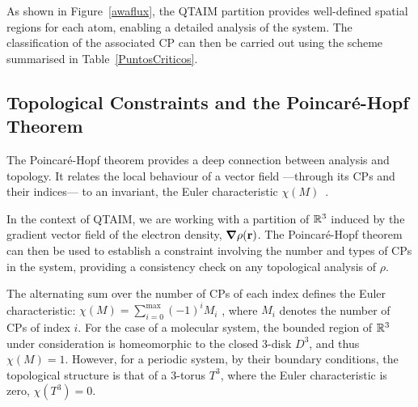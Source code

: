 \vspace{1\baselineskip}%
As shown in Figure~\ref{awaflux}, the \gls{QTAIM} partition provides well-defined
spatial regions for each atom, enabling a detailed analysis of the system. The
classification of the associated \gls{CP} can then be carried out using
the scheme summarised in Table~\ref{PuntosCriticos}.

\newpage
\subsection{Topological Constraints and the Poincaré-Hopf Theorem}\label{phsection}

The Poincaré-Hopf theorem provides a deep connection between analysis and
topology. It relates the local behaviour of a vector field ---through its
\glspl{CP} and their indices--- to an invariant,
the Euler characteristic $\chi(M)$~\cite{Milnor1965}.


In the context of \gls{QTAIM}, we are working with a partition of $\rreal[3]$
induced by the gradient vector field of the electron density,
$\boldsymbol{\nabla}\rho(\mathbf{r})$. The Poincaré-Hopf theorem can then be
used to establish a constraint involving the number and types of \glspl{CP} in
the system, providing a consistency check on any topological analysis of
\(\rho\).

The alternating sum over the number of \glspl{CP} of each index 
defines the Euler characteristic: $\chi(M) = \sum_{i=0}^{\max} (-1)^i M_i$ ,
where $M_i$ denotes the number of \glspl{CP} of index $i$.
For the case of a molecular system, the bounded region of 
$\rreal[3]$ under consideration is homeomorphic to the closed 
3-disk $D^3$, and thus $\chi(M) = 1$.
However, for a periodic system, by their boundary conditions,
the topological structure is that of
a 3-torus $T^3$, where the Euler 
characteristic is zero, $\chi(T^3) = 0$.

